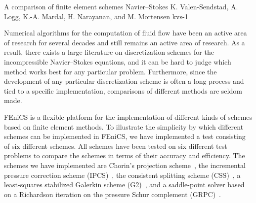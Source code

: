              {A comparison of finite element schemes Navier--Stokes}
              {K. Valen-Sendstad, A. Logg, K.-A. Mardal, H. Narayanan, and M. Mortensen}
              {kvs-1}

\newcommand{\css}[1]{$\mathrm{CSS}_{#1}$}

\newcommand{\scheme}[3]{%
\begin{figure}
  \begin{center}
    \small
    \begin{tabular}{l}
      \hline
      \textbf{Scheme #1:} #2 \\
      \hline
      \begin{minipage}{0.9\textwidth}
        \vspace{0.1cm}
        \begin{enumerate}
          #3
        \end{enumerate}
        \vspace{0.1cm}
      \end{minipage} \\
      \hline
    \end{tabular}
    \normalsize
  \end{center}
\end{figure}}

Numerical algorithms for the computation of fluid flow have been an
active area of research for several decades and still remains an
active area of research. As a result, there exists a large literature
on discretization schemes for the incompressible Navier--Stokes
equations, and it can be hard to judge which method works best for any
particular problem. Furthermore, since the development of any
particular discretization scheme is often a long process and tied to a
specific implementation, comparisons of different methods are seldom
made.

FEniCS is a flexible platform for the implementation of different
kinds of schemes based on finite element methods. To illustrate the
simplicity by which different schemes can be implemented in FEniCS, we
have implemented a test consisting of six different schemes. All
schemes have been tested on six different test problems to compare the
schemes in terms of their accuracy and efficiency. The schemes we have
implemented are Chorin's projection scheme~\cite{Chorin1968, temam}, the
incremental pressure correction scheme (IPCS)~\cite{Goda1979}, the
consistent splitting scheme (CSS)~\cite{GuermondMinevShen2006}, a least-squares
stabilized Galerkin scheme (G2)~\cite{JohnsonHoffman2007}, and a
saddle-point solver based on a Richardson iteration on the pressure
Schur complement (GRPC)~\cite{Turek1996}.

